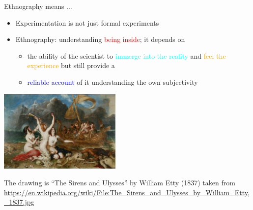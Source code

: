 \documentclass{beamer}
\begin{document}
\begin{frame}
{\centerline{Ethnography means $\ldots{}$}}

\begin{itemize}
\item Experimentation is not just formal experiments
\item Ethnography: understanding \textcolor{red}{being inside}; it depends on
\begin{itemize}
\item the ability of the scientist to \textcolor{cyan}{immerge into the reality} and \textcolor{orange}{feel the experience} but still provide a
\item  \textcolor{blue}{reliable account} of it understanding the own subjectivity
\end{itemize}
\end{itemize}


\begin{center}
 \includegraphics[width=6cm]{P2023.AIBCCSS.ExtendedMindDistributedCognitionSystemicThinking/The_Sirens_and_Ulysses_by_William_Etty.jpg}
 
 \end{center}

\begin{center}
    \tiny{The drawing is ``The Sirens and Ulysses'' by William Etty (1837) taken from \url{https://en.wikipedia.org/wiki/File:The_Sirens_and_Ulysses_by_William_Etty,_1837.jpg}}
 \end{center}

\end{frame}
\end{document}
